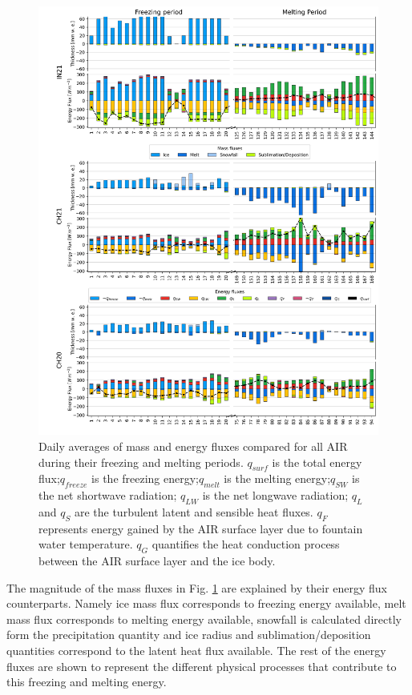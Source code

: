 \documentclass[utf8]{frontiersSCNS} %
\begin{document}
\begin{figure}
	\begin{center}
		\includegraphics[width=\linewidth]{Figures/mass_energy_bal.jpg} \end{center}
	\caption{Daily averages of mass and energy fluxes compared for all AIR during their freezing and melting periods.
		$q_{surf}$ is the total energy flux;$q_{freeze}$ is the freezing energy;$q_{melt}$ is the melting energy;$q_{SW}$ is the net shortwave
		radiation; $q_{LW}$ is the net longwave radiation; $q_{L}$ and $q_{S}$ are the turbulent latent and sensible heat
		fluxes. $q_{F}$ represents energy gained by the AIR surface layer due to fountain water temperature.  $q_{G}$
		quantifies the heat conduction process between the AIR surface layer and the ice body. } \label{fig:MEB}
\end{figure}

The magnitude of the mass fluxes in Fig. \ref{fig:MEB} are explained by their energy flux counterparts. Namely ice mass
flux corresponds to freezing energy available, melt mass flux corresponds to melting energy available, snowfall is
calculated directly form the precipitation quantity and ice radius and sublimation/deposition quantities correspond to
the latent heat flux available. The rest of the energy fluxes are shown to represent the different physical processes
that contribute to this freezing and melting energy.
\end{document}
